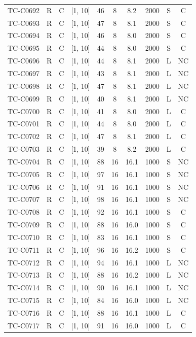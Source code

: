 \begin{longtable}{lccccccccc}
TC-C0692 & R & C & [1, 10] & 46 & 8 & 8.2 & 2000 & S & C \\
TC-C0693 & R & C & [1, 10] & 47 & 8 & 8.1 & 2000 & S & C \\
TC-C0694 & R & C & [1, 10] & 46 & 8 & 8.0 & 2000 & S & C \\
TC-C0695 & R & C & [1, 10] & 44 & 8 & 8.0 & 2000 & S & C \\
TC-C0696 & R & C & [1, 10] & 44 & 8 & 8.1 & 2000 & L & NC \\
TC-C0697 & R & C & [1, 10] & 43 & 8 & 8.1 & 2000 & L & NC \\
TC-C0698 & R & C & [1, 10] & 47 & 8 & 8.1 & 2000 & L & NC \\
TC-C0699 & R & C & [1, 10] & 40 & 8 & 8.1 & 2000 & L & NC \\
TC-C0700 & R & C & [1, 10] & 41 & 8 & 8.0 & 2000 & L & C \\
TC-C0701 & R & C & [1, 10] & 44 & 8 & 8.0 & 2000 & L & C \\
TC-C0702 & R & C & [1, 10] & 47 & 8 & 8.1 & 2000 & L & C \\
TC-C0703 & R & C & [1, 10] & 39 & 8 & 8.2 & 2000 & L & C \\
TC-C0704 & R & C & [1, 10] & 88 & 16 & 16.1 & 1000 & S & NC \\
TC-C0705 & R & C & [1, 10] & 97 & 16 & 16.1 & 1000 & S & NC \\
TC-C0706 & R & C & [1, 10] & 91 & 16 & 16.1 & 1000 & S & NC \\
TC-C0707 & R & C & [1, 10] & 98 & 16 & 16.1 & 1000 & S & NC \\
TC-C0708 & R & C & [1, 10] & 92 & 16 & 16.1 & 1000 & S & C \\
TC-C0709 & R & C & [1, 10] & 88 & 16 & 16.0 & 1000 & S & C \\
TC-C0710 & R & C & [1, 10] & 83 & 16 & 16.1 & 1000 & S & C \\
TC-C0711 & R & C & [1, 10] & 96 & 16 & 16.2 & 1000 & S & C \\
TC-C0712 & R & C & [1, 10] & 94 & 16 & 16.1 & 1000 & L & NC \\
TC-C0713 & R & C & [1, 10] & 88 & 16 & 16.2 & 1000 & L & NC \\
TC-C0714 & R & C & [1, 10] & 90 & 16 & 16.1 & 1000 & L & NC \\
TC-C0715 & R & C & [1, 10] & 84 & 16 & 16.0 & 1000 & L & NC \\
TC-C0716 & R & C & [1, 10] & 88 & 16 & 16.1 & 1000 & L & C \\
TC-C0717 & R & C & [1, 10] & 91 & 16 & 16.0 & 1000 & L & C \\

\end{longtable}

